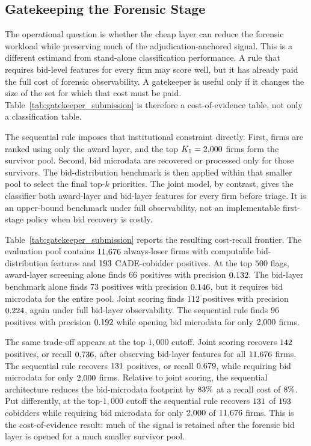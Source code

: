 \subsection{Gatekeeping the Forensic Stage}
\label{sec:sequential_gatekeeper}

The operational question is whether the cheap layer can reduce
the forensic workload while preserving much of the
adjudication-anchored signal. This is a different estimand from
stand-alone classification performance. A rule that requires
bid-level features for every firm may score well, but it has
already paid the full cost of forensic observability. A
gatekeeper is useful only if it changes the size of the set for
which that cost must be paid.
Table~\ref{tab:gatekeeper_submission} is therefore a
cost-of-evidence table, not only a classification table.

The sequential rule imposes that institutional constraint
directly. First, firms are ranked using only the award layer, and
the top $K_1=2{,}000$ firms form the survivor pool.
Second, bid microdata are recovered or processed only for those
survivors. The bid-distribution benchmark is then applied within
that smaller pool to select the final top-$k$ priorities. The
joint model, by contrast, gives the classifier both award-layer
and bid-layer features for every firm before triage. It is an
upper-bound benchmark under full observability, not an
implementable first-stage policy when bid recovery is costly.

Table~\ref{tab:gatekeeper_submission} reports the resulting
cost-recall frontier. The evaluation pool contains
$11{,}676$ always-loser firms with computable
bid-distribution features and $193$ CADE-cobidder
positives. At the top $500$ flags, award-layer screening alone
finds $66$ positives with precision $0.132$.
The bid-layer benchmark alone finds $73$ positives with precision
$0.146$, but it requires bid microdata for
the entire pool. Joint scoring finds $112$ positives with
precision $0.224$, again under full
bid-layer observability. The sequential rule finds $96$
positives with precision $0.192$ while
opening bid microdata for only $2{,}000$ firms.

The same trade-off appears at the top $1{,}000$ cutoff. Joint
scoring recovers $142$ positives, or recall
$0.736$, after observing bid-layer features
for all $11{,}676$ firms. The sequential rule recovers
$131$ positives, or recall
$0.679$, while requiring bid microdata for only
$2{,}000$ firms. Relative to joint scoring, the
sequential architecture reduces the bid-microdata footprint by
$83\%$ at a recall cost of
$8\%$. Put differently, at the top-$1{,}000$
cutoff the sequential rule recovers $131$ of
$193$ cobidders while requiring bid microdata for only
$2{,}000$ of $11{,}676$ firms. This is the
cost-of-evidence result: much of the signal is retained after
the forensic bid layer is opened for a much smaller survivor
pool.

